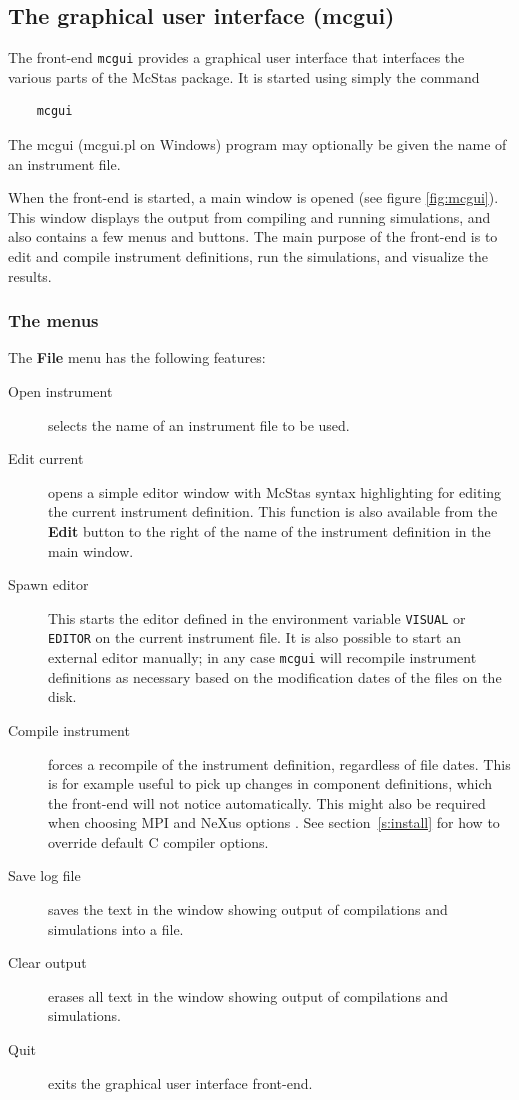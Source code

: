 \subsection{The graphical user interface (mcgui)}
\label{s:mcgui}

The front-end \verb+mcgui+ provides a graphical user interface that
interfaces the various parts of the McStas package. It is started using
simply the command
\begin{verbatim}
    mcgui
\end{verbatim}
The mcgui (mcgui.pl on Windows) program may optionally be given the name of an instrument file.

When the front-end is started, a main window is opened (see figure \ref{fig:mcgui}). This window
displays the output from compiling and running simulations, and also
contains a few menus and buttons. The main purpose of the front-end is
to edit and compile instrument definitions, run the simulations, and
visualize the results.

\subsubsection{The menus}

The {\bf File} menu has the following features:
\begin{description}
\item[Open instrument] selects the name of an instrument file to be used.
\item[Edit current] opens a simple editor window with McStas syntax
  highlighting for editing the
  current instrument definition. This function is also available from
  the {\bf Edit} button to the right of the name of the instrument definition in
  the main window.
\item[Spawn editor] This starts the editor defined in the environment
  variable \verb+VISUAL+ or \verb+EDITOR+ on the current instrument
  file. It is also possible to start an external editor manually; in any
  case \verb+mcgui+ will recompile instrument definitions as necessary based on
  the modification dates of the files on the disk.
\item[Compile instrument] forces a recompile of the instrument
  definition, regardless of file dates. This is for example useful to
  pick up changes in component definitions, which the front-end will not
  notice automatically. This might also be required when choosing MPI  and NeXus options . See section~\ref{s:install} for how to override
  default C compiler options.
\item[Save log file] saves the text in the window showing output of
  compilations and simulations into a file.
\item[Clear output] erases all text in the window showing output of
  compilations and simulations.
\item[Quit] exits the graphical user interface front-end.
\end{description}

